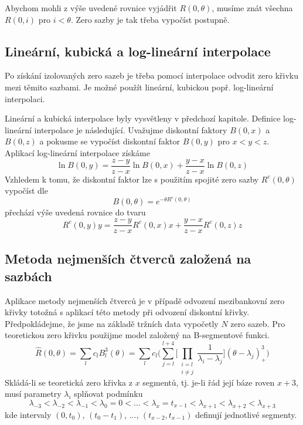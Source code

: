 \documentclass[a4paper]{book}
\begin{document}
Abychom mohli z výše uvedené rovnice vyjádřit $R(0,\theta)$, musíme znát všechna $R(0, i)$ pro $i < \theta$. Zero sazby je tak třeba vypočíst postupně.

\subsection{Lineární, kubická a log-lineární interpolace}

Po získání izolovaných zero sazeb je třeba pomocí interpolace odvodit zero křivku mezi těmito sazbami. Je možné použít lineární, kubickou popř. log-lineární interpolaci.

Lineární a kubická interpolace byly vysvětleny v předchozí kapitole. Definice log-lineární interpolace je následující. Uvažujme diskontní faktory $B(0,x)$ a $B(0,z)$ a pokusme se vypočíst diskontní faktor $B(0,y)$ pro $x < y < z$. Aplikací log-lineární interpolace získáme
\begin{equation*}
\ln B(0,y) = \frac{z-y}{z-x} \ln B(0,x) + \frac{y - x}{z - x} \ln B(0,z)
\end{equation*}
Vzhledem k tomu, že diskontní faktor lze s použitím spojité zero sazby $R^c(0,\theta)$ vypočíst dle
\begin{equation*}
B(0,\theta) = e^{-\theta R^c(0,\theta)}
\end{equation*}
přechází výše uvedená rovnice do tvaru
\begin{equation*}
R^c(0,y)y = \frac{z - y}{z - x}R^c(0,x)x + \frac{y - x}{z - x}R^c(0,z)z
\end{equation*}

\subsection{Metoda nejmenších čtverců založená na sazbách}

Aplikace metody nejmenších čtverců je v případě odvození mezibankovní zero křivky totožná s aplikací této metody při odvození diskontní křivky. Předpokládejme, že jsme na základě tržních data vypočetly $N$ zero sazeb. Pro teoretickou zero křivku použijme model založený na B-segmentové funkci.
\begin{equation*}
\hat{R}(0, \theta) = \sum_l c_l B_l^3(\theta) = \sum_l c_l \Bigg( \sum_{j=l}^{l+4} \Big[ \prod_{\substack{i=l \\ i \neq j}} \frac{1}{\lambda_i - \lambda_j}\Big](\theta - \lambda_j)_{+}^3 \Bigg)
\end{equation*}
Skládá-li se teoretická zero křivka z $x$ segmentů, tj. je-li řád její báze roven $x+3$, musí parametry $\lambda_i$ splňovat podmínku
\begin{equation}
\lambda_{-3} < \lambda_{-2} < \lambda_{-1} < \lambda_0 = 0 < \dots < \lambda_x = t_{x-1} < \lambda_{x+1} < \lambda_{x+2} < \lambda_{x+3}
\end{equation}
kde intervaly $(0, t_0)$, $(t_0 - t_1)$, ..., $(t_{x-2}, t_{x-1})$ definují jednotlivé segmenty.
\end{document}
